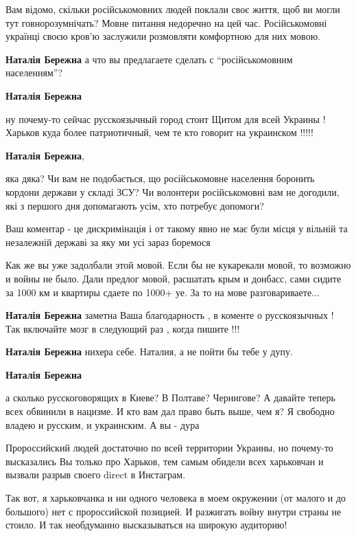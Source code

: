 \begin{itemize}
\begin{itemize}

Вам відомо, скільки російськомовних людей поклали своє життя, щоб ви могли тут
говнорозумнічать? Мовне питання недоречно на цей час. Російськомовні українці
своєю кров'ю заслужили розмовляти комфортною для них мовою.

\textbf{Наталія Бережна} а что вы предлагаете сделать с \enquote{російськомовним населенням}?

\textbf{Наталія Бережна} 

ну почему-то сейчас русскоязычный город стоит Щитом для всей Украины ! Харьков
куда более патриотичный, чем те кто говорит на украинском !!!!!

\textbf{Наталія Бережна}, 

яка дяка? Чи вам не подобається, що російськомовне населення боронить кордони
держави у складі ЗСУ? Чи волонтери російськомовні вам не догодили, які з
першого дня допомагають усім, хто потребує допомоги?

Ваш коментар - це дискримінація і от такому явно не має були місця у вільній та
незалежній державі за яку ми усі зараз боремося


Как же вы уже задолбали этой мовой. Если бы не кукарекали мовой, то возможно и
войны не было. Дали предлог мовой, расшатать крым и донбасс, сами сидите за
1000 км и квартиры сдаете по 1000+ уе. За то на мове разговариваете...

\textbf{Наталія Бережна} заметна Ваша благодарность , в коменте о русскоязычных ! Так включайте мозг в следующий раз , когда пишите !!!

\textbf{Наталія Бережна} нихера себе. Наталия, а не пойти бы тебе у дупу.

\textbf{Наталія Бережна} 

а сколько русскоговорящих в Киеве? В Полтаве? Чернигове? А давайте теперь всех
обвинили в нацизме. И кто вам дал право быть выше, чем я? Я свободно владею и
русским, и украинским. А вы - дура


Пророссийский людей достаточно по всей территории Украины, но почему-то
высказались Вы только про Харьков, тем самым обидели всех харьковчан и вызвали
разрыв своего direct в Инстаграм.

Так вот, я харьковчанка и ни одного человека в моем окружении (от малого и до
большого) нет с пророссийской позицией. И разжигать войну внутри страны не
стоило. И так необдуманно высказываться на широкую аудиторию!


\end{itemize}
\end{itemize}
